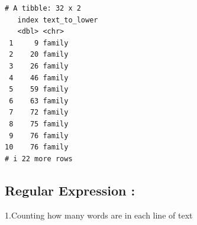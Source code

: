 \documentclass[
  letterpaper,
  DIV=11,
  numbers=noendperiod]{scrartcl}
\newenvironment{Shaded}{\begin{snugshade}}{\end{snugshade}}
\newcommand{\AttributeTok}[1]{\textcolor[rgb]{0.40,0.45,0.13}{#1}}
\newcommand{\FunctionTok}[1]{\textcolor[rgb]{0.28,0.35,0.67}{#1}}
\newcommand{\NormalTok}[1]{\textcolor[rgb]{0.00,0.23,0.31}{#1}}
\newcommand{\SpecialCharTok}[1]{\textcolor[rgb]{0.37,0.37,0.37}{#1}}
\newcommand{\StringTok}[1]{\textcolor[rgb]{0.13,0.47,0.30}{#1}}
\begin{document}
\begin{verbatim}
# A tibble: 32 x 2
   index text_to_lower
   <dbl> <chr>        
 1     9 family       
 2    20 family       
 3    26 family       
 4    46 family       
 5    59 family       
 6    63 family       
 7    72 family       
 8    75 family       
 9    76 family       
10    76 family       
# i 22 more rows
\end{verbatim}

\subsection{Regular Expression :}\label{regular-expression}

1.Counting how many words are in each line of text

\begin{Shaded}
\end{Shaded}
\end{document}
